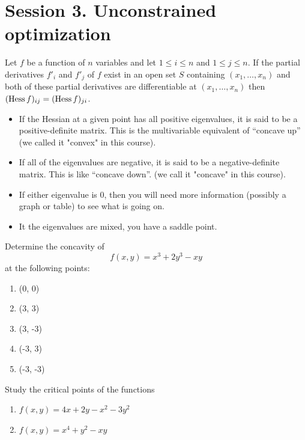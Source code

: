\section{Session 3. Unconstrained optimization}

Let $f$ be a function of $n$ variables and let $1 \leq i \leq n$ and $1 \leq j \leq n$. If the partial derivatives $f'_i$ and $f'_j$ of $f$ exist in an open set $S$ containing $(x_1,\ldots, x_n)$ and both of these partial derivatives are differentiable at $(x_1, \ldots, x_n)$ then $(\operatorname{Hess} f)_{ij}=(\operatorname{Hess} f)_{ji}$.

\begin{itemize}
  \item If the Hessian at a given point has all positive eigenvalues, it is said to be a positive-definite matrix. This is the multivariable equivalent of “concave up” (we called it "convex" in this course).
  \item If all of the eigenvalues are negative, it is said to be a negative-definite matrix. This is like “concave down”. (we call it "concave" in this course).
  \item If either eigenvalue is 0, then you will need more
  information (possibly a graph or table) to see what
  is going on.
  \item It the eigenvalues are mixed, you have a saddle point.
\end{itemize}

\begin{Exercise}
  Determine the concavity of
\[f(x, y) = x^3 + 2y^3 - xy\]
at the following points:
\begin{enumerate}
  \item (0, 0)
  \item (3, 3)
  \item (3, -3)
  \item (-3, 3)
  \item (-3, -3)
\end{enumerate}
\end{Exercise}
\begin{Exercise}
  Study the critical points of the functions 
  \begin{enumerate}
    \item $f(x,y)=4x+2y-x^2-3y^2$
    \item $f(x, y) = x^4 + y^2 - xy$
  \end{enumerate}
  
\end{Exercise}


